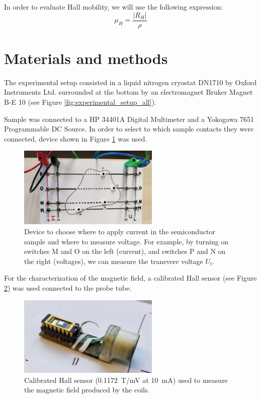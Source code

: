 \documentclass[11pt,a4paper]{article}
\begin{document}
In order to evaluate Hall mobility, we will use the following expression:
\begin{equation}
\mu_H=\frac{|R_H|}{\rho}
\end{equation}

\section{Materials and methods}

The experimental setup consisted in a liquid nitrogen cryostat DN1710 by Oxford Instruments Ltd. surrounded at the bottom by an electromagnet Bruker Magnet B-E 10 (see Figure \ref{fig:experimental_setup_all}).

Sample was connected to a HP 34401A Digital Multimeter and a Yokogawa 7651 Programmable DC Source. In order to select to which sample contacts they were connected, device shown in Figure \ref{fig:cables} was used.

\begin{figure}[H]
\centering
\includegraphics[width=0.6\textwidth]{Experimental_setup_cables}
\caption{Device to choose where to apply current in the semiconductor sample and where to measure voltage. For example, by turning on switches M and O on the left (current), and switches P and N on the right (voltages), we can measure the transvere voltage $U_t$.}
\label{fig:cables}
\end{figure}

For the characterization of the magnetic field, a calibrated Hall sensor (see Figure \ref{fig:Hall_sensor}) was used connected to the probe tube.

\begin{figure}[H]
\centering
\includegraphics[width=0.6\textwidth]{Hall_sensor}
\caption{Calibrated Hall sensor (\SI{0.1172}{\tesla/\milli\volt} at \SI{10}{\milli\ampere}) used to measure the magnetic field produced by the coils.}
\label{fig:Hall_sensor}
\end{figure}
\end{document}
